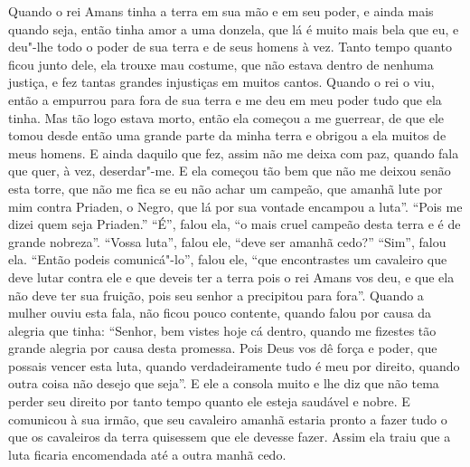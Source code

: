  Quando o rei Amans tinha a terra em sua mão e em seu poder, e ainda mais quando
seja, então tinha amor a uma donzela, que lá é muito mais bela que eu, e
deu"-lhe todo o poder de sua terra e de seus homens à vez. Tanto tempo quanto
ficou junto dele, ela trouxe mau costume, que não estava dentro de nenhuma
justiça, e fez tantas grandes injustiças em muitos cantos. Quando o rei o viu,
então a empurrou para fora de sua terra e me deu em meu poder tudo que ela
tinha. Mas tão logo estava morto, então ela começou a me guerrear, de que ele
tomou desde então uma grande parte da minha terra e obrigou a ela muitos de
meus homens. E ainda daquilo que fez, assim não me deixa com paz, quando fala
que quer, à vez, deserdar"-me. E ela começou tão bem que não me deixou senão
esta torre, que não me fica se eu não achar um campeão, que amanhã lute por mim
contra Priaden, o Negro, que lá por sua vontade encampou a luta”. “Pois me
dizei quem seja Priaden.” “É”, falou ela, “o mais cruel campeão desta terra e é
de grande nobreza”. “Vossa luta”, falou ele, “deve ser amanhã cedo?” “Sim”,
falou ela. “Então podeis comunicá"-lo”, falou ele, “que encontrastes um
cavaleiro que deve lutar contra ele e que deveis ter a terra pois o rei Amans
vos deu, e que ela não deve ter sua fruição, pois seu senhor a precipitou para
fora”. Quando a mulher ouviu esta fala, não ficou pouco contente, quando falou
por causa da alegria que tinha: “Senhor, bem vistes hoje cá dentro, quando me
fizestes tão grande alegria por causa desta promessa. Pois Deus vos dê força e
poder, que possais vencer esta luta, quando verdadeiramente tudo é meu por
direito, quando outra coisa não desejo que seja”. E ele a consola muito e lhe
diz que não tema perder seu direito por tanto tempo quanto ele esteja saudável
e nobre. E comunicou à sua irmão, que seu cavaleiro amanhã estaria pronto a
fazer tudo o que os cavaleiros da terra quisessem que ele devesse fazer. Assim
ela traiu que a luta ficaria encomendada até a outra manhã cedo. 

